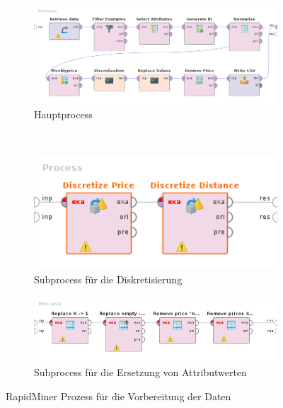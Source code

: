 \begin{figure}[htb]
	\begin{subfigure}[t]{1\textwidth}
		\centering
		\includegraphics[width=1\textwidth]{images/rapidminer-process}
		\caption{Hauptprocess}
		\label{fig:recherche:rapidminer:1:1}
	\end{subfigure} \\
	\begin{subfigure}[t]{0.5\textwidth}
		\centering
		\includegraphics[width=1\textwidth]{images/rapidminer-process-discretization}
		\caption{Subprocess für die Diskretisierung}
		\label{fig:recherche:rapidminer:1:2}
	\end{subfigure}
	\begin{subfigure}[t]{0.8\textwidth}
		\centering
		\includegraphics[width=1\textwidth]{images/rapidminer-process-replace-values}
		\caption{Subprocess für die Ersetzung von Attributwerten}
		\label{fig:recherche:rapidminer:1:3}
	\end{subfigure}
	\caption{RapidMiner Prozess für die Vorbereitung der Daten}
	\label{fig:recherche:rapidminer:1}
\end{figure}

